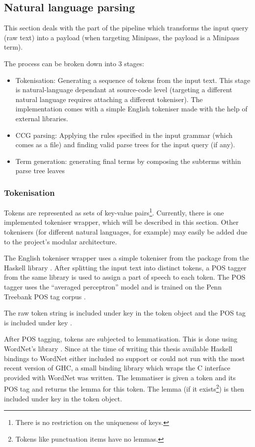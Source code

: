 \documentclass[main.tex]{subfiles}
\begin{document}
\subsection{Natural language parsing}
This section deals with the part of the pipeline which transforms the input
query (raw text) into a payload (when targeting Minipass, the payload is a
Minipass term).

The process can be broken down into 3 stages:
\begin{itemize}
    \item Tokenisation: Generating a sequence of tokens from the input text.
        This stage is natural-language dependant at source-code level (targeting
        a different natural language requires attaching a different tokeniser).
        The implementation comes with a simple English tokeniser made with the
        help of external libraries.
    \item CCG parsing: Applying the rules specified in the input grammar (which
        comes as a  file) and finding valid parse trees for the
        input query (if any).
    \item Term generation: generating final terms by composing the subterms
        within parse tree leaves
\end{itemize}

\subsubsection{Tokenisation}\label{sec:tokenisation}
Tokens are represented as sets of key-value pairs\footnote{There is no
    restriction on the uniqueness of keys.}. Currently, there is one
implemented tokeniser wrapper, which will be described in this section. Other
tokenisers (for different natural languages, for example) may easily be added
due to the project's modular architecture.

The English tokeniser wrapper uses a simple tokeniser from the 
package from the  Haskell library \cite{chatter}.
After splitting the input text into distinct tokens, a POS tagger from the
same library is used to assign a part of speech to each token. The POS
tagger uses the ``averaged perceptron'' model \cite{collins} and is trained
on the Penn Treebank POS tag corpus \cite{penn}.

The raw token string is included under key  in the token object and
the POS tag is included under key .

After POS tagging, tokens are subjected to lemmatisation. This is done using
WordNet's  library \cite{wordnet}. Since at the time of writing
this thesis available Haskell bindings to WordNet either included no 
support or could not run with the most recent version of GHC, a small binding
library which wraps the C interface provided with WordNet was written. The
 lemmatiser is given a token and its POS tag and returns the lemma
for this token. The lemma (if it exists\footnote{Tokens like punctuation items have
    no lemmas.}) is then included under key  in the token object.
\end{document}
